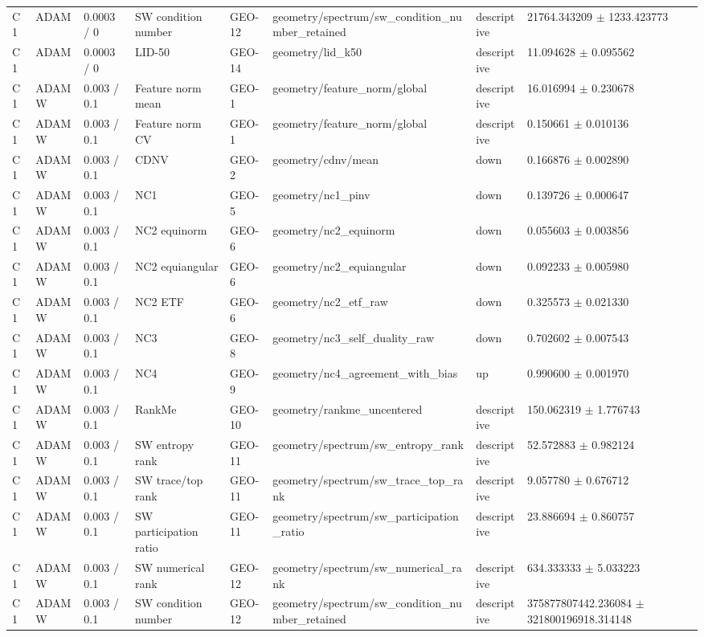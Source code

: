 \begin{longtable}{llllllll}
C1 & ADAM & 0.0003 / 0 & SW condition number & GEO-12 & geometry/spectrum/sw\_condition\_number\_retained & descriptive & 21764.343209 $\pm$ 1233.423773 \\
C1 & ADAM & 0.0003 / 0 & LID-50 & GEO-14 & geometry/lid\_k50 & descriptive & 11.094628 $\pm$ 0.095562 \\
C1 & ADAMW & 0.003 / 0.1 & Feature norm mean & GEO-1 & geometry/feature\_norm/global & descriptive & 16.016994 $\pm$ 0.230678 \\
C1 & ADAMW & 0.003 / 0.1 & Feature norm CV & GEO-1 & geometry/feature\_norm/global & descriptive & 0.150661 $\pm$ 0.010136 \\
C1 & ADAMW & 0.003 / 0.1 & CDNV & GEO-2 & geometry/cdnv/mean & down & 0.166876 $\pm$ 0.002890 \\
C1 & ADAMW & 0.003 / 0.1 & NC1 & GEO-5 & geometry/nc1\_pinv & down & 0.139726 $\pm$ 0.000647 \\
C1 & ADAMW & 0.003 / 0.1 & NC2 equinorm & GEO-6 & geometry/nc2\_equinorm & down & 0.055603 $\pm$ 0.003856 \\
C1 & ADAMW & 0.003 / 0.1 & NC2 equiangular & GEO-6 & geometry/nc2\_equiangular & down & 0.092233 $\pm$ 0.005980 \\
C1 & ADAMW & 0.003 / 0.1 & NC2 ETF & GEO-6 & geometry/nc2\_etf\_raw & down & 0.325573 $\pm$ 0.021330 \\
C1 & ADAMW & 0.003 / 0.1 & NC3 & GEO-8 & geometry/nc3\_self\_duality\_raw & down & 0.702602 $\pm$ 0.007543 \\
C1 & ADAMW & 0.003 / 0.1 & NC4 & GEO-9 & geometry/nc4\_agreement\_with\_bias & up & 0.990600 $\pm$ 0.001970 \\
C1 & ADAMW & 0.003 / 0.1 & RankMe & GEO-10 & geometry/rankme\_uncentered & descriptive & 150.062319 $\pm$ 1.776743 \\
C1 & ADAMW & 0.003 / 0.1 & SW entropy rank & GEO-11 & geometry/spectrum/sw\_entropy\_rank & descriptive & 52.572883 $\pm$ 0.982124 \\
C1 & ADAMW & 0.003 / 0.1 & SW trace/top rank & GEO-11 & geometry/spectrum/sw\_trace\_top\_rank & descriptive & 9.057780 $\pm$ 0.676712 \\
C1 & ADAMW & 0.003 / 0.1 & SW participation ratio & GEO-11 & geometry/spectrum/sw\_participation\_ratio & descriptive & 23.886694 $\pm$ 0.860757 \\
C1 & ADAMW & 0.003 / 0.1 & SW numerical rank & GEO-12 & geometry/spectrum/sw\_numerical\_rank & descriptive & 634.333333 $\pm$ 5.033223 \\
C1 & ADAMW & 0.003 / 0.1 & SW condition number & GEO-12 & geometry/spectrum/sw\_condition\_number\_retained & descriptive & 375877807442.236084 $\pm$ 321800196918.314148 \\

\end{longtable}
